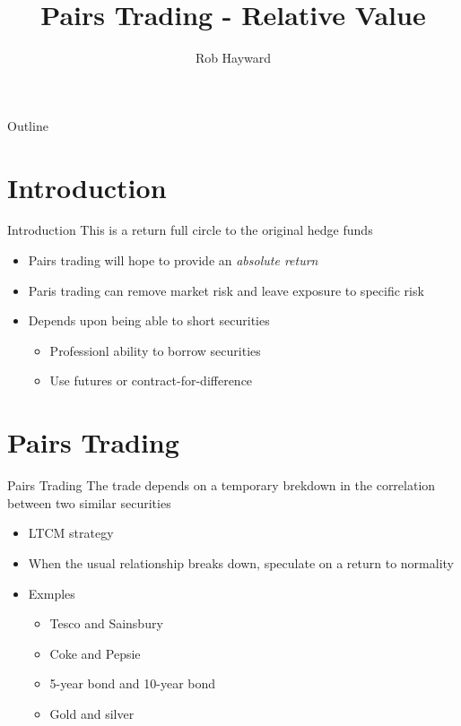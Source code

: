 \documentclass[14pt,xcolor=pdftex,dvipsnames,table]{beamer}\usepackage[]{graphicx}\usepackage[]{color}
\title{Pairs Trading - Relative Value}
\author{Rob Hayward}
\begin{document}
\begin{frame}
\titlepage
\end{frame}

\begin{frame}{Outline}
\tableofcontents
\end{frame}

\section{Introduction}
\begin{frame}{Introduction}
This is a return full circle to the original hedge funds
\begin{itemize}[<+-| alert@+>]
\item Pairs trading will hope to provide an \emph{absolute return}
\item Paris trading can remove market risk and leave exposure to specific risk
\item Depends upon being able to short securities
\begin{itemize}
\item Professionl ability to borrow securities
\item Use futures or contract-for-difference
\end{itemize}
\end{itemize}
\end{frame}

\section{Pairs Trading}
\begin{frame}{Pairs Trading}
The trade depends on a temporary brekdown in the correlation between two similar securities
\begin{itemize}[<+-| alert@+>]
\item LTCM strategy
\item When the usual relationship breaks down, speculate on a return to normality
\item Exmples
\begin{itemize}
\item Tesco and Sainsbury
\item Coke and Pepsie
\item 5-year bond and 10-year bond
\item Gold and silver
\end{itemize}
\end{itemize}
\end{frame}
\end{document}

